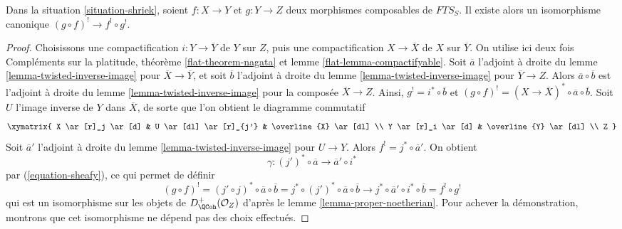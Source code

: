 \begin{lemma}
\label{lemma-upper-shriek-composition}
Dans la situation \ref{situation-shriek}, soient $f : X \to Y$ et $g : Y \to Z$ deux morphismes composables de $\textit{FTS}_S$. Il existe alors un isomorphisme canonique $(g \circ f)^! \to f^! \circ g^!$.
\end{lemma}

\begin{proof}
Choisissons une compactification $i : Y \to \overline{Y}$ de $Y$ sur $Z$, puis une compactification $X \to \overline{X}$ de $X$ sur $\overline{Y}$. On utilise ici deux fois Compléments sur la platitude, théorème \ref{flat-theorem-nagata} et lemme \ref{flat-lemma-compactifyable}. Soit $\overline{a}$ l'adjoint à droite du lemme \ref{lemma-twisted-inverse-image} pour $\overline{X} \to \overline{Y}$, et soit $\overline{b}$ l'adjoint à droite du lemme \ref{lemma-twisted-inverse-image} pour $\overline{Y} \to Z$. Alors $\overline{a} \circ \overline{b}$ est l'adjoint à droite du lemme \ref{lemma-twisted-inverse-image} pour la composée $\overline{X} \to Z$. Ainsi, $g^! = i^* \circ \overline{b}$ et $(g \circ f)^! = (X \to \overline{X})^* \circ \overline{a} \circ \overline{b}$. Soit $U$ l'image inverse de $Y$ dans $\overline{X}$, de sorte que l'on obtient le diagramme commutatif
$$
\xymatrix{
X \ar[r]_j \ar[d] & U \ar[dl] \ar[r]_{j'} & \overline{X} \ar[dl] \\
Y \ar[r]_i \ar[d] & \overline{Y} \ar[dl] \\
Z
}
$$
Soit $\overline{a}'$ l'adjoint à droite du lemme \ref{lemma-twisted-inverse-image} pour $U \to Y$. Alors $f^! = j^* \circ \overline{a}'$. On obtient
$$
\gamma : (j')^* \circ \overline{a} \to \overline{a}' \circ i^*
$$
par (\ref{equation-sheafy}), ce qui permet de définir
$$
(g \circ f)^! =
(j' \circ j)^* \circ \overline{a} \circ \overline{b} =
j^* \circ (j')^* \circ \overline{a} \circ \overline{b}
\to
j^* \circ \overline{a}' \circ i^* \circ \overline{b} =
f^! \circ g^!
$$
qui est un isomorphisme sur les objets de $D_\QCoh^+(\mathcal{O}_Z)$ d'après le lemme \ref{lemma-proper-noetherian}. Pour achever la démonstration, montrons que cet isomorphisme ne dépend pas des choix effectués.


\end{proof}
